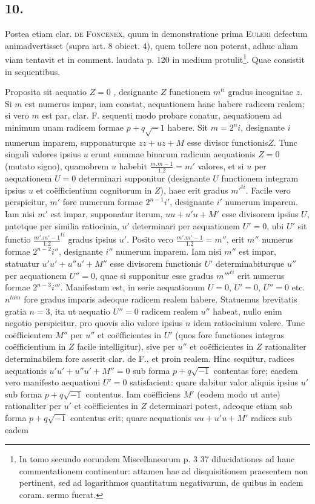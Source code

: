 \documentclass[14pt]{memoir}
\theoremstyle{plain}
\theoremstyle{remark}
\begin{document}
\subsection*{10.}

Postea etiam clar. \textsc{de Foncenex}, quum in demonstratione prima \textsc{Euleri} defectum animadvertisset (supra art. 8 obiect. 4), quem tollere non poterat, adhuc aliam viam tentavit et in comment. laudata p. 120 in medium protulit\footnote{In tomo secundo eorundem Miscellaneorum p. 3 37 dilucidationes ad hanc commentationem continentur: attamen hae ad disquisitionem praesentem non pertinent, sed ad logarithmos quantitatum negativarum, de quibus in eadem coram. sermo fuerat.}. Quae consistit in sequentibus.

Proposita sit aequatio \(Z = 0\) , designante \(Z\) functionem \(m^{ti}\) gradus incognitae \(z\). Si \(m\) est numerus impar, iam constat, aequationem hanc habere radicem realem; si vero \(m\) est par, clar. \textsc{F.} sequenti modo probare conatur, aequationem ad minimum unam radicem formae \(p+q\surd-1\) habere. Sit \(m=2^n i\), designante \(i\) numerum imparem, supponaturque \(zz + uz + M\) esse divisor functionis\(Z\). Tunc singuli valores ipsius \(u\) erunt summae binarum radicum aequationis \(Z = 0\) (mutato signo), quamobrem \(u\) habebit \(\frac{m . m-1}{1 . 2} = m'\) valores, et si \(u\) per aequationem \(U=0\) determinari supponitur (designante \(U\) functionem integram ipsius \(u\) et co\"efficientium cognitorum in \(Z\)), haec erit gradus \({m'}^{ti}\). Facile vero perspicitur, \(m'\) fore numerum formae \(2^{n-1} i' \), designante \(i'\) numerum imparem. Iam nisi \(m'\) est impar, supponatur iterum, \(uu + u'u + M'\) esse divisorem ipsius \(U\), patetque per similia ratiocinia, \(u'\) determinari per aequationem \(U'= 0\), ubi \(U'\) sit functio \(\frac{m' . m'-1}{1 . 2}^{ti}\) gradus ipsius \(u'\). Posito vero \(\frac{m' . m'-1}{1 . 2} = m''\), erit \(m''\) numerus formae \(2^{n-2}i''\), designante \(i''\) numerum imparem. Iam nisi \(m''\) est impar, statuatur \(u'u'+u''u'+M''\) esse divisorem functionis \(U'\) determinabiturque \(u''\) per aequationem \(U'' = 0\), quae si supponitur esse gradus \({m'''}^{ti}\) erit numerus formae \(2^{n-3}i'''\). Manifestum est, in serie aequationum \(U=0\), \(U'=0\), \(U''=0\) etc. \(n^{tam}\) fore gradus imparis adeoque radicem realem habere. Statuemus brevitatis gratia \(n = 3\), ita ut aequatio \(U'' = 0\) radicem realem \(u''\) habeat, nullo enim negotio perspicitur, pro quovis alio valore ipsius \(n\) idem ratiocinium valere. Tunc co\"efficientem \(M''\) per \(u''\) et co\"efficientes in \(U'\) (quos fore functiones integras co\"efficientium in \(Z\) facile intelligitur), sive per \(u''\) et co\"efficientes in \(Z\) rationaliter determinabilem fore asserit clar. de \textsc{F.}, et proin realem. Hinc sequitur, radices aequationis \(u'u'+u''u'+M''=0\) sub forma \(p+q\surd{-1}\) contentas fore; eaedem vero manifesto aequationi \(U' = 0\) satisfacient: quare dabitur valor aliquis ipsius \(u'\) sub forma \(p+q\surd{-1}\) contentus. Iam co\"efficiens \(M'\) (eodem modo ut ante) rationaliter per \(u'\) et co\"efficientes in \(Z\) determinari potest, adeoque etiam sab forma \(p+q\surd{-1}\) contentus erit; quare aequationis \(uu+u'u+M'\) radices sub eadem 
\end{document}
